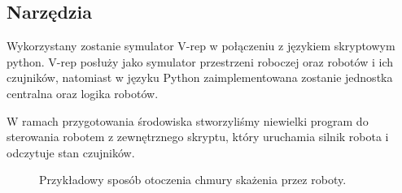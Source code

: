 \documentclass[a4paper, 12pt]{article}
\begin{document}
		
	
	\subsection{Narzędzia}
	Wykorzystany zostanie symulator V-rep w połączeniu z językiem skryptowym python. V-rep posłuży jako symulator przestrzeni roboczej oraz robotów i ich czujników, natomiast w języku Python zaimplementowana zostanie jednostka centralna oraz logika robotów.
	
	W ramach przygotowania środowiska stworzyliśmy niewielki program do sterowania robotem z zewnętrznego skryptu, który uruchamia silnik robota i odczytuje stan czujników. 
	
	\begin{figure}[h!]
		\centering
		\caption{Przykładowy sposób otoczenia chmury skażenia przez roboty.}
	\end{figure}
	
	\clearpage
\end{document}
